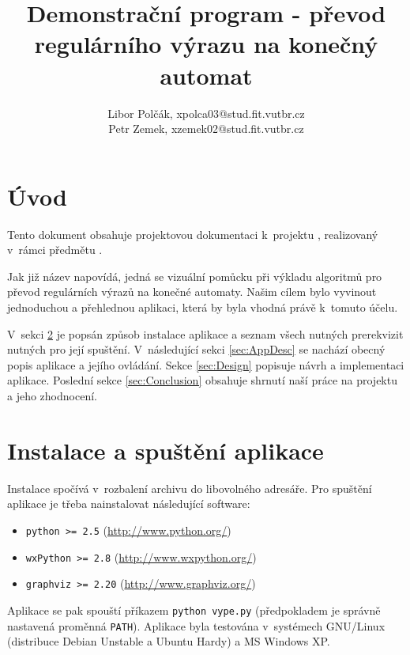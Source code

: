 \documentclass[10pt, notitlepage]{article}
\title{Demonstrační program - převod regulárního výrazu na konečný automat}
\author{
Libor Polčák, xpolca03@stud.fit.vutbr.cz \\
Petr Zemek, xzemek02@stud.fit.vutbr.cz \\
}
\begin{document}
\maketitle

\setcounter{page}{2}


\section{Úvod}
\label{sec:Introduction}

Tento dokument obsahuje projektovou dokumentaci k~projektu , realizovaný v~rámci
předmětu .

Jak již název napovídá, jedná se vizuální pomůcku při výkladu algoritmů pro
převod regulárních výrazů na konečné automaty. Našim cílem bylo vyvinout
jednoduchou a přehlednou aplikaci, která by byla vhodná právě k~tomuto účelu.

V~sekci \ref{sec:Installation} je popsán způsob instalace aplikace a seznam
všech nutných prerekvizit nutných pro její spuštění. V~následující sekci
\ref{sec:AppDesc} se nachází obecný popis aplikace a jejího ovládání. Sekce
\ref{sec:Design} popisuje návrh a implementaci aplikace. Poslední sekce
\ref{sec:Conclusion} obsahuje shrnutí naší práce na projektu a jeho zhodnocení.

\section{Instalace a spuštění aplikace}
\label{sec:Installation}

Instalace spočívá v~rozbalení archivu do libovolného adresáře. Pro spuštění
aplikace je třeba nainstalovat následující software:

\begin{itemize}
	\item \texttt{python >= 2.5} (\url{http://www.python.org/})
	\item \texttt{wxPython >= 2.8} (\url{http://www.wxpython.org/})
	\item \texttt{graphviz >= 2.20} (\url{http://www.graphviz.org/})
\end{itemize}

Aplikace se pak spouští příkazem \texttt{python vype.py} (předpokladem je
správně nastavená proměnná \texttt{PATH}). Aplikace byla testována v~systémech
GNU/Linux (distribuce Debian Unstable a Ubuntu Hardy) a MS Windows XP.
\end{document}
